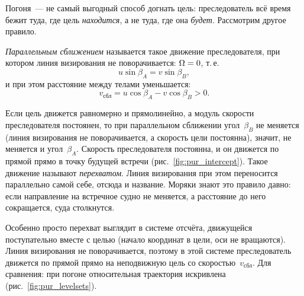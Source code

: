 \documentclass[../main.tex]{subfiles}
\begin{document}
Погоня~--- не самый выгодный способ догнать цель: преследователь всё время бежит
туда, где цель \emph{находится}, а не туда, где она \emph{будет}. Рассмотрим другое
правило.

\begin{definition}
\textit{Параллельным сближением} называется такое движение преследователя, при
котором линия визирования не поворачивается: $\Omega \hm= 0$, т.\,е.
\[
u\sin\beta_A = v\sin\beta_B,
\]
и при этом расстояние между телами уменьшается:
\[
v_{\text{сбл}} = u\cos\beta_A - v\cos\beta_B > 0.
\]
\end{definition}

Если цель движется равномерно и прямолинейно, а модуль скорости преследователя
постоянен, то при параллельном сближении угол~$\beta_B$ не меняется (линия визирования
не поворачивается, а скорость цели постоянна), значит, не меняется и угол~$\beta_A$.
Скорость преследователя постоянна, и он движется по прямой прямо в точку будущей
встречи (рис.~\ref{fig:pur_intercept}). Такое движение называют \textit{перехватом}.
Линия визирования при этом переносится параллельно самой себе, отсюда и название.
Моряки знают это правило давно: если направление на встречное судно не меняется, а
расстояние до него сокращается, суда столкнутся.

Особенно просто перехват выглядит в системе отсчёта, движущейся поступательно вместе
с целью (начало координат в цели, оси не вращаются). Линия визирования не
поворачивается, поэтому в этой системе преследователь движется по прямой прямо на
неподвижную цель со скоростью~$v_{\text{сбл}}$. Для сравнения: при погоне
относительная траектория искривлена (рис.~\ref{fig:pur_levelsets}).

\end{document}

